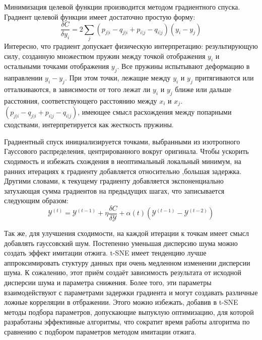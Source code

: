 Минимизация целевой функции производится методом градиентного спуска. Градиент целевой функции имеет достаточно простую форму:
\begin{equation}
	\frac{\delta C}{\delta y_i} = 2 \sum_j (p_{j|i} - q_{j|i} + p_{i|j} - q_{i|j})(y_i - y_j)
\end{equation}
Интересно, что градиент допускает физическую интерпретацию: результирующую силу, созданную множеством пружин между точкой отображения $y_i$ и остальными точками отображения $y_j$. Все пружины испытывают деформацию в направлении $y_i - y_j$. При этом точки, лежащие между $y_i$ и $y_j$ притягиваются или отталкиваются, в зависимости от того лежат ли $y_i$ и $y_j$ ближе или дальше расстояния, соответствующего расстоянию между $x_i$ и $x_j$. $(p_{j|i} - q_{j|i} + p_{i|j} - q_{i|j})$, имеющее смысл расхождения между попарными сходствами, интерпретируется как жесткость пружины. 

Градиентный спуск инициализируется точками, выбранными из изотропного Гауссового распределения, центрированного вокруг оригинала. Чтобы ускорить сходимость и избежать схождения в неоптимальный локальный минимум, на ранних итерациях к градиенту добавляется относительно ,большая задержка. Другими словами, к текущему градиенту добавляется экспоненциально затухающая сумма градиентов на предыдущих шагах, что записывается следующим образом:
\begin{equation}
	\mathcal{Y}^{(t)} = \mathcal{Y}^{(t-1)} + \eta \frac{\delta C}{\delta \mathcal{Y}} + \alpha(t) (\mathcal{Y}^{(t-1)} - \mathcal{Y}^{(t-2)})
\end{equation}

Так же, для улучшения сходимости, на каждой итерации к точкам имеет смысл добавлять гауссовский шум. Постепенно уменьшая дисперсию шума можно создать эффект имитации отжига. t-SNE имеет тенденцию лучше аппроксимировать стуктуру данных при очень медленном изменении дисперсии шума. К сожалению, этот приём создаёт зависимость результата от исходной дисперсии шума и параметра снижения. Более того, эти параметры взаимодействуют с параметрами задержки градиента и могут создавать различные ложные корреляции в отбражении. Этого можно избежать, добавив в t-SNE методы подбора параметров, допускающие выпуклую оптимизацию, для которой разработаны эффективные алгоритмы, что сократит время работы алгоритма по сравнению с подбором параметров методом имитации отжига\cite{maaten2008visualizing}.

